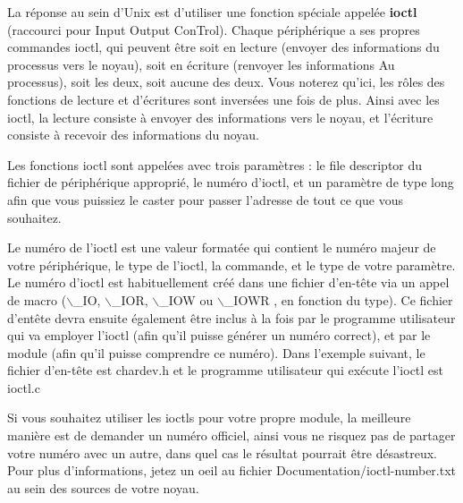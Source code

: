 \documentclass[11pt]{article}
\begin{document}
La réponse au sein d'Unix est d'utiliser une fonction spéciale appelée \textbf{ioctl} (raccourci pour Input Output ConTrol). Chaque périphérique a ses propres commandes ioctl, qui peuvent être soit en lecture (envoyer des informations du processus vers le noyau), soit en écriture (renvoyer les informations Au processus), soit les deux, soit aucune des deux. Vous noterez qu'ici, les rôles des fonctions de lecture et d'écritures sont inversées une fois de plus. Ainsi avec les ioctl, la lecture consiste à envoyer des informations vers le noyau, et l'écriture consiste à recevoir des informations du noyau.

Les fonctions ioctl sont appelées avec trois paramètres : le file descriptor du fichier de périphérique approprié, le numéro d'ioctl, et un paramètre de type long afin que vous puissiez le caster pour passer l'adresse de tout ce que vous souhaitez.

Le numéro de l'ioctl est une valeur formatée qui contient le numéro majeur de votre périphérique, le type de l'ioctl, la commande, et le type de votre paramètre. Le numéro d'ioctl est habituellement créé dans une fichier d'en-tête via un appel de macro ($\backslash$\_IO, $\backslash$\_IOR, $\backslash$\_IOW ou $\backslash$\_IOWR , en fonction du type). Ce fichier d'entête devra ensuite également être inclus à la fois par le programme utilisateur qui va employer l'ioctl (afin qu'il puisse générer un numéro correct), et par le module (afin qu'il puisse comprendre ce numéro). Dans l'exemple suivant, le fichier d'en-tête est chardev.h et le programme utilisateur qui exécute l'ioctl est ioctl.c

Si vous souhaitez utiliser les ioctls pour votre propre module, la meilleure manière est de demander un numéro officiel, ainsi vous ne risquez pas de partager votre numéro avec un autre, dans quel cas le résultat pourrait être désastreux. Pour plus d'informations, jetez un oeil au fichier Documentation/ioctl-number.txt au sein des sources de votre noyau.
\end{document}
